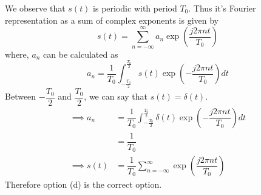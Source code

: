 \documentclass[journal,12pt,twocolumn]{IEEEtran}
\begin{document}
We observe that $s(t)$ is periodic with period $T_0$. Thus it's Fourier representation as a sum of complex exponents is given by
\begin{equation}
    s(t) = \sum_{n=-\infty}^{\infty}a_n\exp\left(\dfrac{j2\pi nt}{T_0}\right)
\end{equation}
where, $a_n$ can be calculated as
\begin{equation}
    a_n = \dfrac{1}{T_0}\int_{-\frac{T_0}{2}}^{\frac{T_0}{2}}s(t)\exp\left(-\dfrac{j2\pi nt}{T_0}\right)dt
\end{equation}
Between $-\dfrac{T_0}{2}$ and $\dfrac{T_0}{2}$, we can say that $s(t) = \delta(t)$.
\begin{align}
    \implies a_n &= \dfrac{1}{T_0}\int_{-\frac{T_0}{2}}^{\frac{T_0}{2}}\delta(t)\exp\left(-\dfrac{j2\pi nt}{T_0}\right)dt\\
        &= \dfrac{1}{T_0}\\
    \implies s(t) &= \dfrac{1}{T_0}\sum_{n=-\infty}^{\infty}\exp\left(\dfrac{j2\pi nt}{T_0}\right)
\end{align}
Therefore option (d) is the correct option.
\end{document}
